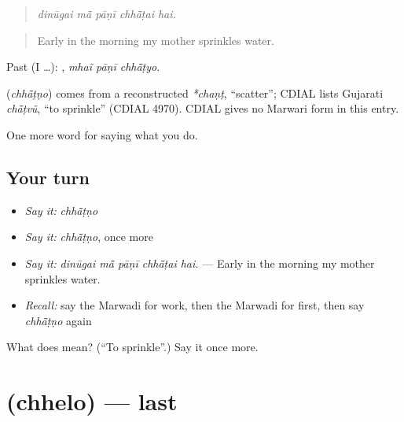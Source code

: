 \begin{quote}
    
\end{quote}

\begin{quote}
\emph{dinūgai mā̃ pāṇī chhā̃ṭai hai.}
\end{quote}

\begin{quote}
Early in the morning my mother sprinkles water.
\end{quote}

Past (I …):   , \emph{mhaĩ pāṇī chhā̃ṭyo}.

\begin{cousinweb}
\textbf{} (\emph{chhā̃ṭṇo}) comes from a reconstructed \emph{*chaṇṭ}, \textquotedblleft{}scatter\textquotedblright{}; CDIAL lists Gujarati \emph{chā̃ṭvũ}, \textquotedblleft{}to sprinkle\textquotedblright{} (CDIAL 4970). CDIAL gives no Marwari form in this entry.
\end{cousinweb}

\begin{grammarlens}[title={What you've built}]
One more word for saying what you do.
\end{grammarlens}

\subsection*{Your turn}
\begin{itemize}
\raggedright
  \item \emph{Say it:} \emph{chhā̃ṭṇo}
  \item \emph{Say it:} \emph{chhā̃ṭṇo}, once more
  \item \emph{Say it:} \emph{dinūgai mā̃ pāṇī chhā̃ṭai hai.} — Early in the morning my mother sprinkles water.
  \item \emph{Recall:} say the Marwadi for work, then the Marwadi for first, then say \emph{chhā̃ṭṇo} again
\end{itemize}

\begin{tcolorbox}[breakable,colback=teal!4,colframe=teal!35!black,title={Before you move on}]
What does  mean? (\textquotedblleft{}To sprinkle\textquotedblright{}.) Say it once more.
\end{tcolorbox}
\section[\texorpdfstring{\mw{छेलो} (chhelo)}{छेलो (chhelo)}]{ (chhelo) — last}


